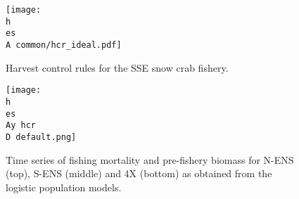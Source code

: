 \documentclass[11pt]{article}
\newcommand{\D}{.}
\newcommand{\h}{C:/} %
\newcommand{\es}{bio.data/bio.snowcrab/} %
\newcommand{\Ay}{assessments/2017/}
\newcommand{\A}{assessments/}
\begin{document}

\begin{figure}
\centering
	\texttt{[image: \\h \\es \\A common/hcr\_ideal.pdf]}\\ 
\caption{Harvest control rules for the SSE snow crab fishery.}
\end{figure}
\clearpage


\begin{figure}
\centering
	\texttt{[image: \\h \\es \\Ay hcr\\D default.png]}\\ 
\caption{Time series of fishing mortality and pre-fishery biomass for N-ENS (top), S-ENS (middle) and 4X (bottom) as obtained from the logistic population models.}
\end{figure}
\clearpage


%
\end{document}
